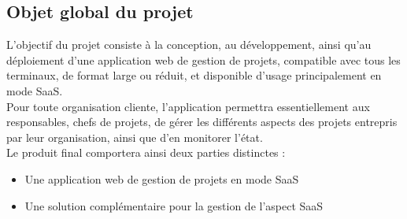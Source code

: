 \begin{spacing}{1.5}
\subsection{Objet global du projet}
L'objectif du projet consiste à la conception, au développement, ainsi qu’au déploiement d’une application web de gestion de projets, compatible avec tous les terminaux, de format large ou réduit, et disponible d’usage principalement en mode SaaS.\\
Pour toute organisation cliente, l’application permettra essentiellement aux responsables, chefs de projets, de gérer les différents aspects des projets entrepris par leur organisation, ainsi que d’en monitorer l’état.\\

Le produit final comportera ainsi deux parties distinctes :
\begin{itemize}
    \item Une application web de gestion de projets en mode SaaS
    \item Une solution complémentaire pour la gestion de l’aspect SaaS
\end{itemize}


\end{spacing}
